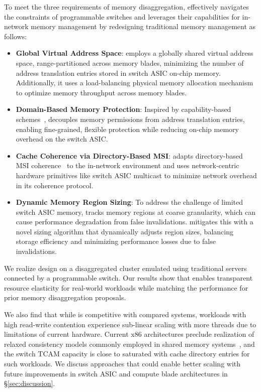 To meet the three requirements of memory disaggregation, \mind effectively navigates the constraints of programmable switches and leverages their capabilities for in-network memory management by redesigning traditional memory management as follows:
\begin{itemize}
  \item \textbf{Global Virtual Address Space}: \mind employs a globally shared virtual address space, range-partitioned across memory blades, minimizing the number of address translation entries stored in switch ASIC on-chip memory. Additionally, it uses a load-balancing physical memory allocation mechanism to optimize memory throughput across memory blades.
  
  \item \textbf{Domain-Based Memory Protection}: Inspired by capability-based schemes~\cite{capabilityaddr, cap, opal}, \mind decouples memory permissions from address translation entries, enabling fine-grained, flexible protection while reducing on-chip memory overhead on the switch ASIC.
  
  \item \textbf{Cache Coherence via Directory-Based MSI}: \mind adapts directory-based MSI coherence~\cite{msi} to the in-network environment and uses network-centric hardware primitives like switch ASIC multicast to minimize network overhead in its coherence protocol.
  
  \item \textbf{Dynamic Memory Region Sizing}: To address the challenge of limited switch ASIC memory, \mind tracks memory regions at coarse granularity, which can cause performance degradation from false invalidations. \mind mitigates this with a novel sizing algorithm that dynamically adjusts region sizes, balancing storage efficiency and minimizing performance losses due to false invalidations.
\end{itemize}

We realize \mind design on a disaggregated cluster emulated using traditional servers connected by a programmable switch. Our results show that \mind enables transparent resource elasticity for real-world workloads while matching the performance for prior memory disaggregation proposals. 

We also find that while \mind is competitive with compared systems, workloads with high read-write contention experience sub-linear scaling with more threads due to limitations of current hardware. Current x86 architectures preclude realization of relaxed consistency models commonly employed in shared memory systems~\cite{gam}, and the switch TCAM capacity is close to saturated with cache directory entries for such workloads. We discuss approaches that could enable better scaling with future improvements in switch ASIC and compute blade architectures in \S\ref{sec:discussion}.


